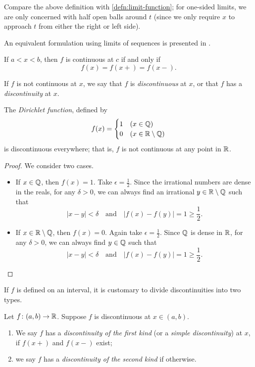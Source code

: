 \begin{remark}
Compare the above definition with \cref{defn:limit-function}; for one-sided limits, we are only concerned with half open balls around $t$ (since we only require $x$ to approach $t$ from either the right or left side).
\end{remark}

\begin{remark}
An equivalent formulation using limits of sequences is presented in \cite{rudin}.
\end{remark}

\begin{lemma}
If $a<x<b$, then $f$ is continuous at $c$ if and only if
\[f(x)=f(x+)=f(x-).\]
\end{lemma}

If $f$ is not continuous at $x$, we say that $f$ is \emph{discontinuous} at $x$, or that $f$ has a \emph{discontinuity} at $x$.

\begin{example}
The \emph{Dirichlet function}, defined by
\[f(x)=\begin{cases}
1&(x\in\mathbb Q)\\
0&(x\in\mathbb R\setminus\mathbb Q)
\end{cases}\]
is discontinuous everywhere; that is, $f$ is not continuous at any point in $\mathbb R$.
\begin{proof}
We consider two cases.
\begin{itemize}
\item If $x\in\mathbb Q$, then $f(x)=1$. Take $\epsilon=\frac{1}{2}$. Since the irrational numbers are dense in the reals, for any $\delta>0$, we can always find an irrational $y\in\mathbb R\setminus\mathbb Q$ such that 
\[|x-y|<\delta\quad\text{and}\quad |f(x)-f(y)|=1\ge\frac{1}{2}.\]
\item If $x\in\mathbb R\setminus\mathbb Q$, then $f(x)=0$. Again take $\epsilon=\frac{1}{2}$. Since $\mathbb Q$ is dense in $\mathbb R$, for any $\delta>0$, we can always find $y\in\mathbb Q$ such that
\[|x-y|<\delta\quad\text{and}\quad |f(x)-f(y)|=1\ge\frac{1}{2}.\]
\end{itemize}
\end{proof}
\end{example}

If $f$ is defined on an interval, it is customary to divide discontinuities into two types.

\begin{definition}[Discontinuities]
Let $f\colon (a,b)\to\mathbb R$. Suppose $f$ is discontinuous at $x\in(a,b)$.
\begin{enumerate}[label=(\roman*)]
\item We say $f$ has a \emph{discontinuity of the first kind} (or a \emph{simple discontinuity}) at $x$, if $f(x+)$ and $f(x-)$ exist;
\item we say $f$ has a \emph{discontinuity of the second kind} if otherwise.
\end{enumerate}
\end{definition}

